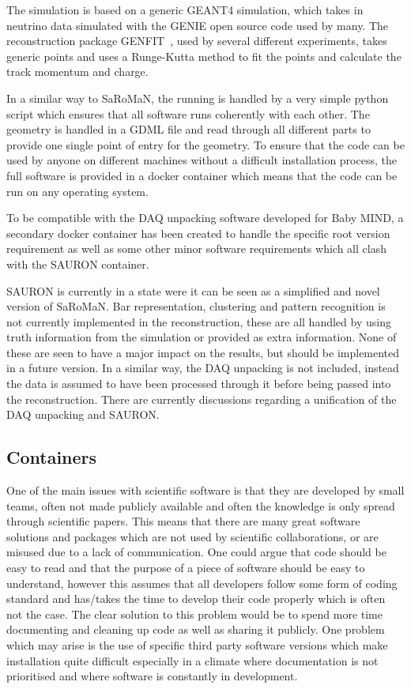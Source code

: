 The simulation is based on a generic GEANT4 simulation, which takes in neutrino data simulated with the GENIE open source code used by many. The reconstruction package  GENFIT~\cite{81Genfit}, used by several different experiments, takes generic points and uses a Runge-Kutta method to fit the points and calculate the track momentum and charge.

In a similar way to SaRoMaN, the running is handled by a very simple python script which ensures that all software runs coherently with each other. The geometry is handled in a GDML file and read through all different parts to provide one single point of entry for the geometry. To ensure that the code can be used by anyone on different machines without a difficult installation process, the full software is provided in a docker container which means that the code can be run on any operating system. 

To be compatible with the DAQ unpacking software developed for Baby MIND, a secondary docker container has been created to handle the specific root version requirement as well as some other minor software requirements which all clash with the SAURON container.

SAURON is currently in a state were it can be seen as a simplified and novel version of SaRoMaN. Bar representation, clustering and pattern recognition is not currently implemented in the reconstruction, these are all handled by using truth information from the simulation or provided as extra information. None of these are seen to have a major impact on the results, but should be implemented in a future version. In a similar way, the DAQ unpacking is not included, instead the data is assumed to have been processed through it before being passed into the reconstruction. There are currently discussions regarding a unification of the DAQ unpacking and SAURON.

\subsection{Containers}
One of the main issues with scientific software is that they are developed by small teams, often not made publicly available and often the knowledge is only spread through scientific papers. This means that there are many great software solutions and packages which are not used by scientific collaborations, or are misused due to a lack of communication. One could argue that code should be easy to read and that the purpose of a piece of software should be easy to understand, however this assumes that all developers follow some form of coding standard and has/takes the time to develop their code properly which is often not the case. The clear solution to this problem would be to spend more time documenting and cleaning up code as well as sharing it publicly. One problem which may arise is the use of specific third party software versions which make installation quite difficult especially in a climate where documentation is not prioritised and where software is constantly in development.

